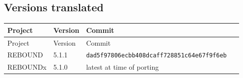 \documentclass[11pt]{article}
\begin{document}
\subsection{Versions translated}

\begin{longtable}{L{0.133\linewidth}L{0.117\linewidth}L{0.700\linewidth}}
\toprule
Project & Version & Commit \\
\midrule
\endfirsthead
\toprule
Project & Version & Commit \\
\midrule
\endhead
REBOUND & 5.1.1 & \texttt{dad5f97806ecbb408dcaff728851c64e67f9f6eb} \\
REBOUNDx & 5.1.0 & latest at time of porting \\
\bottomrule
\end{longtable}
\end{document}
